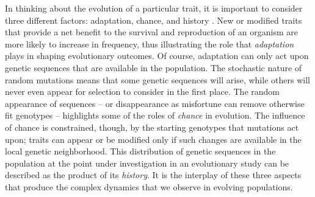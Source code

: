 In thinking about the evolution of a particular trait, it is important to consider three different factors: adaptation, chance, and history \citep{travisanoExperimentalTestsRoles1995}.
New or modified traits that provide a net benefit to the survival and reproduction of an organism are more likely to increase in frequency, thus illustrating the role that \textit{adaptation} plays in shaping evolutionary outcomes. 
Of course, adaptation can only act upon genetic sequences that are available in the population.
The stochastic nature of random mutations means that some genetic sequences will arise, while others will never even appear for selection to consider in the first place.
The random appearance of sequences -- or disappearance as misfortune can remove otherwise fit genotypes -- highlights some of the roles of \textit{chance} in evolution.
The influence of chance is constrained, though, by the starting genotypes that mutations act upon; traits can appear or be modified only if such changes are available in the local genetic neighborhood.
This distribution of genetic sequences in the population at the point under investigation in an evolutionary study can be described as the product of its \textit{history}.
It is the interplay of these three aspects that produce the complex dynamics that we observe in evolving populations.

